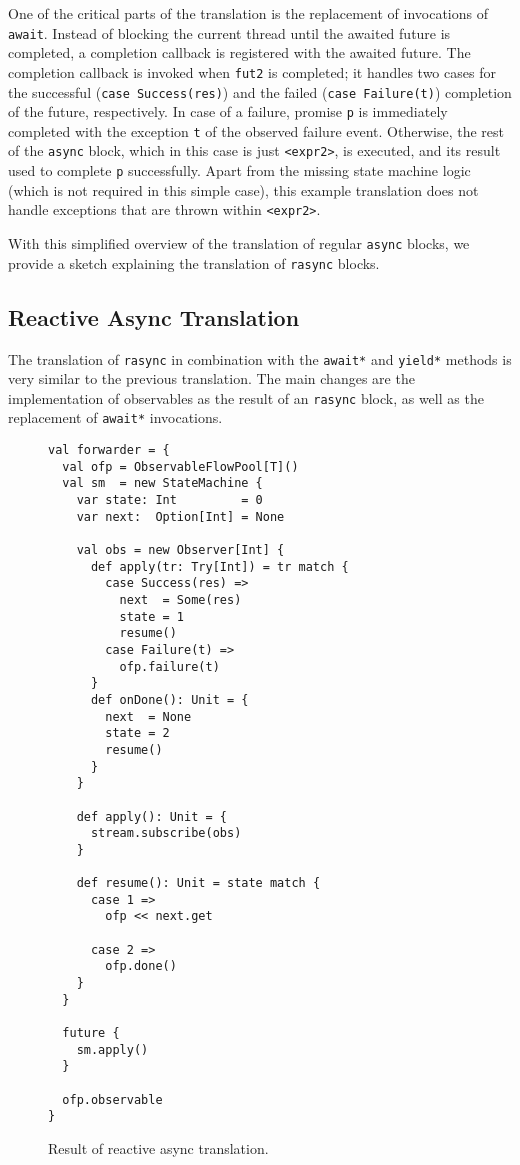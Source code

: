 \documentclass{acm_proc_article-sp}
\begin{document}
One of the critical parts of the translation is the replacement of invocations
of \verb|await|. Instead of blocking the current thread until the awaited
future is completed, a completion callback is registered with the awaited
future. The completion callback is invoked when \verb|fut2| is completed; it
handles two cases for the successful (\verb|case Success(res)|) and the failed
(\verb|case Failure(t)|) completion of the future, respectively. In case of a
failure, promise \verb|p| is immediately completed with the exception \verb|t|
of the observed failure event. Otherwise, the rest of the \verb|async| block,
which in this case is just \verb|<expr2>|, is executed, and its result used to
complete \verb|p| successfully. Apart from the missing state machine logic
(which is not required in this simple case), this example translation does not
handle exceptions that are thrown within \verb|<expr2>|.

With this simplified overview of the translation of regular \verb|async|
blocks, we provide a sketch explaining the translation of \verb|rasync|
blocks.

\subsection{Reactive Async Translation}\label{sec:rasync-translation}

The translation of \verb|rasync| in combination with the \verb|await*| and
\verb|yield*| methods is very similar to the previous translation. The main
changes are the implementation of observables as the result of an
\verb|rasync| block, as well as the replacement of \verb|await*| invocations.

\begin{figure}[ht!]
  \centering
\lstset{numbers=left,xleftmargin=2em}
\begin{lstlisting}
val forwarder = {
  val ofp = ObservableFlowPool[T]()
  val sm  = new StateMachine {
    var state: Int         = 0
    var next:  Option[Int] = None

    val obs = new Observer[Int] {
      def apply(tr: Try[Int]) = tr match {
        case Success(res) =>
          next  = Some(res)
          state = 1
          resume()
        case Failure(t) =>
          ofp.failure(t)
      }
      def onDone(): Unit = {
        next  = None
        state = 2
        resume()
      }
    }

    def apply(): Unit = {
      stream.subscribe(obs)
    }

    def resume(): Unit = state match {
      case 1 =>
        ofp << next.get

      case 2 =>
        ofp.done()
    }
  }

  future {
    sm.apply()
  }

  ofp.observable
}
\end{lstlisting}
  \caption{Result of reactive async translation.}
  \label{fig:rasync-translation}
\end{figure}
\end{document}
